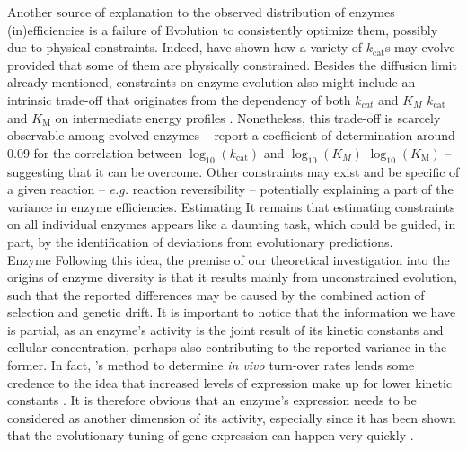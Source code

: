 \documentclass[11pt,onecolumn]{article}
\providecommand{\DIFadd}[1]{{\protect\color{blue} \sf #1}} %
\providecommand{\DIFdel}[1]{{\protect\color{red} \scriptsize #1}} %
\providecommand{\DIFaddbegin}{} %
\providecommand{\DIFaddend}{} %
\providecommand{\DIFdelbegin}{} %
\providecommand{\DIFdelend}{} %
\begin{document}
\DIFaddbegin \DIFadd{Another source of explanation to the observed distribution of enzymes (in)efficiencies is a failure of Evolution to consistently optimize them, possibly due to physical constraints. Indeed, \citet{Heckmann18} have shown how a variety of $k_\text{cat}$s may evolve provided that some of them are physically constrained. }\DIFaddend Besides the diffusion limit already mentioned, constraints on enzyme evolution \DIFdelbegin \DIFdel{also }\DIFdelend \DIFaddbegin \DIFadd{might }\DIFaddend include an intrinsic trade-off \DIFaddbegin \DIFadd{\citep{Gudelj10,Stiffler15} }\DIFaddend that originates from the dependency of both \DIFdelbegin \DIFdel{$k_{cat}$ and $K_M$ }\DIFdelend \DIFaddbegin \DIFadd{$k_\text{cat}$ and $K_\text{M}$ }\DIFaddend on intermediate energy profiles \citep{Heinrich91}. Nonetheless, this trade-off is scarcely observable among evolved enzymes -- \citet{Bar-Even11} report a coefficient of determination around $0.09$ for the correlation between $\log_{10}(k_\text{cat})$ and \DIFdelbegin \DIFdel{$\log_{10}(K_M)$ }\DIFdelend \DIFaddbegin \DIFadd{$\log_{10}(K_\text{M})$ }\DIFaddend -- suggesting that it can be overcome. 
Other constraints may exist and be specific of a given reaction \citep{Klipp94} -- \textit{e.g.} reaction reversibility -- potentially explaining a part of the variance in enzyme efficiencies.
\DIFdelbegin \DIFdel{Estimating }\DIFdelend \DIFaddbegin \DIFadd{It remains that estimating }\DIFaddend constraints on all individual enzymes appears like a daunting task, which could be guided, in part, by the identification of deviations from evolutionary predictions.\DIFaddbegin \\
\DIFaddend 


\DIFdelbegin \DIFdel{Enzyme }\DIFdelend \DIFaddbegin \DIFadd{Following this idea, the premise of our theoretical investigation into the origins of enzyme diversity is that it results mainly from unconstrained evolution, such that the reported differences may be caused by the combined action of selection and genetic drift. It is important to notice that the information we have is partial, as an enzyme's activity is the joint result of its kinetic constants and cellular concentration, perhaps also contributing to the reported variance in the former. In fact, \citet{Davidi16}'s method to determine \textit{in vivo} turn-over rates lends some credence to the idea that increased levels of expression make up for lower kinetic constants \citep{Davidi18}. It is therefore obvious that an enzyme's expression needs to be considered as another dimension of its activity, especially since it has been shown that the evolutionary tuning of gene expression can happen very quickly \citep{Dekel05}.
}
\end{document}
